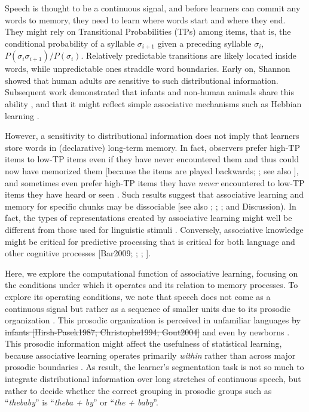 \documentclass[
]{article}
\begin{document}
Speech is thought to be a continuous signal, and before learners can
commit any words to memory, they need to learn where words start and
where they end. They might rely on Transitional Probabilities (TPs)
among items, that is, the conditional probability of a syllable
\(\sigma_{i+1}\) given a preceding syllable \(\sigma_{i}\),
\(P(\sigma_{i}\sigma_{i+1})/P(\sigma_{i})\). Relatively predictable
transitions are likely located inside words, while unpredictable ones
straddle word boundaries. Early on, Shannon \citep{Shannon1951} showed
that human adults are sensitive to such distributional information.
Subsequent work demonstrated that infants and non-human animals share
this ability
\citep{Aslin1998, Chen2015, Fiser2002, Hauser2001, Saffran-Science, Toro2005-backward},
and that it might reflect simple associative mechanisms such as Hebbian
learning \citep{Goujon2015, Endress-TP-Model}.

However, a sensitivity to distributional information does not imply that
learners store words in (declarative) long-term memory. In fact,
observers prefer high-TP items to low-TP items even if they have never
encountered them and thus could now have memorized them {[}because the
items are played backwards; \citet{Turk-Browne-reversal}; see also
\citet{Jones2007}{]}, and sometimes even prefer high-TP items they have
\emph{never} encountered to low-TP items they have heard or seen
\citep{Endress-Phantoms-Vision}. Such results suggest that associative
learning and memory for specific chunks may be dissociable {[}see also
\citet{Cohen1980}; \citet{Knowlton1996a}; \citet{Poldrack2001};
\citet{Squire1992} and Discussion). In fact, the types of
representations created by associative learning might well be different
from those used for linguistic stimuli
\citep{Endress-Phantoms-Vision, Fischer-Baum2011}. Conversely,
associative knowledge might be critical for predictive processing
\citep{Sherman2020, Turk-Browne2010} that is critical for both language
\citep{Levy2008, Trueswell1999} and other cognitive processes
{[}Bar2009; \citet{Clark2013}; \citet{Friston2010};
\citet{Keller2018}{]}.

Here, we explore the computational function of associative learning,
focusing on the conditions under which it operates and its relation to
memory processes. To explore its operating conditions, we note that
speech does not come as a continuous signal but rather as a sequence of
smaller units due to its prosodic organization
\citep{Cutler1997, Nespor1986, Shattuck-Hufnagel1996}. This prosodic
organization is perceived in unfamiliar languages
\citep{Brentari2011, Endress-cross-seg, Fenlon2008, Pilon1981} \st{by
infants {[}Hirsh-Pasek1987; Christophe1994; Gout2004{]}} and even by
newborns \citep{Christophe2001}. This prosodic information might affect
the usefulness of statistical learning, because associative learning
operates primarily \emph{within} rather than across major prosodic
boundaries \citep{Shukla2011}. As result, the learner's segmentation
task is not so much to integrate distributional information over long
stretches of continuous speech, but rather to decide whether the correct
grouping in prosodic groups such as ``\emph{thebaby}'' is ``\emph{theba
+ by}'' or ``\emph{the + baby}''.
\end{document}
